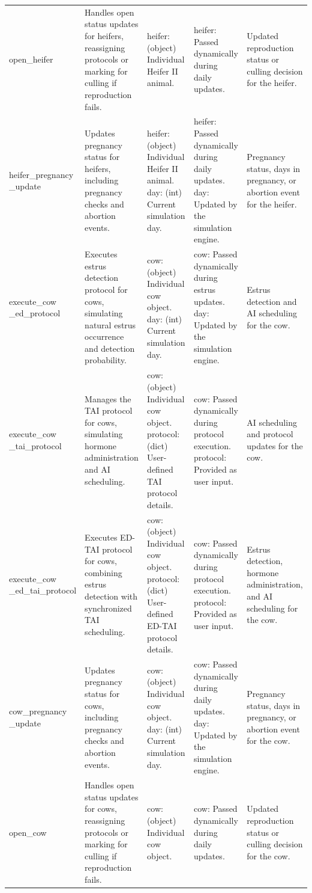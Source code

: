 \begin{refsection}
\begin{landscape}
\begin{longtable}{@{} L{3cm}  L{7cm} L{4cm} L{4cm} L{4cm}  @{}}
open\_heifer &  Handles open status updates for heifers, reassigning protocols or marking for culling if reproduction fails. & heifer: (object) Individual Heifer II animal. & heifer: Passed dynamically during daily updates. & Updated reproduction status or culling decision for the heifer. \\
heifer\_pregnancy \_update &  Updates pregnancy status for heifers, including pregnancy checks and abortion events. & heifer: (object) Individual Heifer II animal. day: (int) Current simulation day. & heifer: Passed dynamically during daily updates. day: Updated by the simulation engine. & Pregnancy status, days in pregnancy, or abortion event for the heifer. \\
execute\_cow \_ed\_protocol &  Executes estrus detection protocol for cows, simulating natural estrus occurrence and detection probability. & cow: (object) Individual cow object. day: (int) Current simulation day. & cow: Passed dynamically during estrus updates. day: Updated by the simulation engine. & Estrus detection and AI scheduling for the cow. \\
execute\_cow \_tai\_protocol &  Manages the TAI protocol for cows, simulating hormone administration and AI scheduling. & cow: (object) Individual cow object. protocol: (dict) User-defined TAI protocol details. & cow: Passed dynamically during protocol execution. protocol: Provided as user input. & AI scheduling and protocol updates for the cow. \\
execute\_cow \_ed\_tai\_protocol &  Executes ED-TAI protocol for cows, combining estrus detection with synchronized TAI scheduling. & cow: (object) Individual cow object. protocol: (dict) User-defined ED-TAI protocol details. & cow: Passed dynamically during protocol execution. protocol: Provided as user input. & Estrus detection, hormone administration, and AI scheduling for the cow. \\
cow\_pregnancy \_update &  Updates pregnancy status for cows, including pregnancy checks and abortion events. & cow: (object) Individual cow object. day: (int) Current simulation day. & cow: Passed dynamically during daily updates. day: Updated by the simulation engine. & Pregnancy status, days in pregnancy, or abortion event for the cow. \\
open\_cow &  Handles open status updates for cows, reassigning protocols or marking for culling if reproduction fails. & cow: (object) Individual cow object. & cow: Passed dynamically during daily updates. & Updated reproduction status or culling decision for the cow. \\



\end{longtable}
\end{landscape}
\end{refsection}
